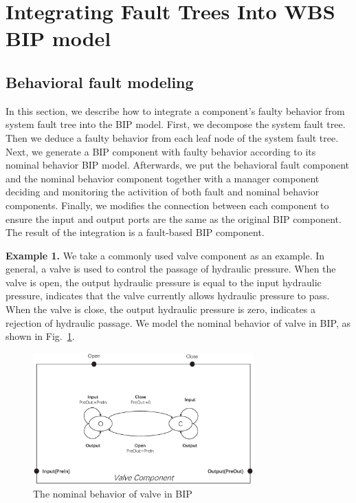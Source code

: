 

\section{Integrating Fault Trees Into WBS BIP model}

\subsection{Behavioral fault modeling}
In this section, we describe how to integrate a component's faulty behavior from system fault tree\cite{ft} into the BIP model. First, we decompose the system fault tree. Then we deduce a faulty behavior from each leaf node of the system fault tree. Next, we generate a BIP component with faulty behavior according to its nominal behavior BIP model. Afterwards, we put the behavioral fault component and the nominal behavior component together with a manager component deciding and monitoring the activition of both fault and nominal behavior components. Finally, we modifies the connection between each component to ensure the input and output ports are the same as the original BIP component. The result of the integration is a fault-based BIP component.

\textbf{Example 1.} We take a commonly used valve component as an example. In general, a valve is used to control the passage of hydraulic pressure. When the valve is open, the output hydraulic pressure is equal to the input hydraulic pressure, indicates that the valve currently allows hydraulic pressure to pass. When the valve is close, the output hydraulic pressure is zero, indicates a rejection of hydraulic passage. We model the nominal behavior of valve in BIP, as shown in Fig.~\ref{example_BIP_nominal}.

\begin{figure}[htbp]
	\centerline{\includegraphics[width=85mm]{figure/example_origin.eps}}
	\caption{The nominal behavior of valve in BIP}
	\label{example_BIP_nominal}
\end{figure}

